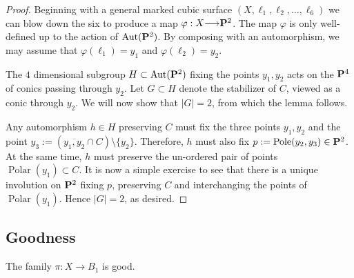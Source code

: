 \documentclass[12pt,reqno]{amsart}
\DeclareMathOperator{\Polar}{Polar}
\DeclareMathOperator{\Pole}{Pole}
\renewcommand{\to}{{\longrightarrow}}
\numberwithin{equation}{section}
\begin{document}
  \begin{proof}
    Beginning with a general marked cubic surface
    $(X, \ell_{1}, \ell_2, \dots, \ell_{6})$ we can blow down the six
    to produce a map $\varphi: X \to \P^2$. The map $\varphi$ is only
    well-defined up to the action of $\Aut(\P^{2})$.  By composing
    with an automorphism, we may assume that
    $\varphi(\ell_{1}) = y_{1}$ and $\varphi(\ell_{2}) = y_{2}$.

    The $4$ dimensional subgroup $H \subset \Aut(\P^{2})$ fixing the
    points $y_{1}, y_{2}$ acts on the $\P^{4}$ of conics passing
    through $y_{2}$. Let $G \subset H$ denote the stabilizer of $C$,
    viewed as a conic through $y_{2}$.  We will now show that $|G|=2$,
    from which the lemma follows.

    Any automorphism $h \in H$ preserving $C$ must fix the three
    points $y_{1},y_{2}$ and the point
    $y_{3}:= (\overline{y_{1},y_{2}} \cap C) \setminus \{y_{2}\}.$
    Therefore, $h$ must also fix $p := \Pole(y_{2},y_{3}) \in \P^{2}$.
    At the same time, $h$ must preserve the un-ordered pair of points
    $\Polar(y_{1}) \subset C$. It is now a simple exercise to see that
    there is a unique involution on $\P^{2}$ fixing $p$, preserving
    $C$ and interchanging the points of $\Polar(y_{1})$. Hence
    $|G|=2$, as desired.
  \end{proof}




\subsection{Goodness}
\label{sec:goodness1}

\begin{proposition}
  \label{prop:B1good}
  The family $\pi: X \to B_1$ is good.
\end{proposition}
\end{document}
